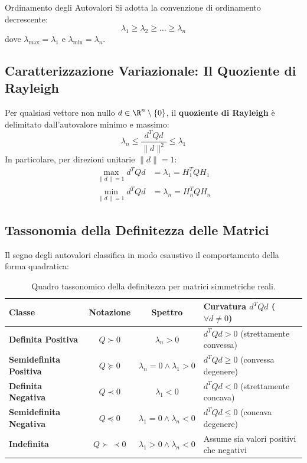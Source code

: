 \begin{noteblock}{Ordinamento degli Autovalori}
Si adotta la convenzione di ordinamento decrescente:
\begin{equation}
\lambda_1 \ge \lambda_2 \ge \dots \ge \lambda_n
\end{equation}
dove $\lambda_{\max} = \lambda_1$ e $\lambda_{\min} = \lambda_n$.
\end{noteblock}

\subsection{Caratterizzazione Variazionale: Il Quoziente di Rayleigh}
Per qualsiasi vettore non nullo $d \in \R^n \setminus \{0\}$, il \textbf{quoziente di Rayleigh} \`e delimitato dall'autovalore minimo e massimo:
\begin{equation}
\lambda_n \le \frac{d^T Q d}{\|d\|^2} \le \lambda_1
\end{equation}
In particolare, per direzioni unitarie $\|d\| = 1$:
\begin{align}
\max_{\|d\|=1} d^T Q d &= \lambda_1 = H_1^T Q H_1 \\
\min_{\|d\|=1} d^T Q d &= \lambda_n = H_n^T Q H_n
\end{align}

\subsection{Tassonomia della Definitezza delle Matrici}
Il segno degli autovalori classifica in modo esaustivo il comportamento della forma quadratica:

\begin{table}[H]
\centering
\small
\renewcommand{\arraystretch}{1.3}
\begin{tabularx}{\textwidth}{l c c X}
\toprule
\textbf{Classe} & \textbf{Notazione} & \textbf{Spettro} & \textbf{Curvatura $d^T Q d$ ($\forall d \neq 0$)} \\
\midrule
\textbf{Definita Positiva} & $Q \succ 0$ & $\lambda_n > 0$ & $d^T Q d > 0$ (strettamente convessa) \\
\textbf{Semidefinita Positiva} & $Q \succeq 0$ & $\lambda_n = 0 \land \lambda_1 > 0$ & $d^T Q d \ge 0$ (convessa degenere) \\
\textbf{Definita Negativa} & $Q \prec 0$ & $\lambda_1 < 0$ & $d^T Q d < 0$ (strettamente concava) \\
\textbf{Semidefinita Negativa} & $Q \preceq 0$ & $\lambda_1 = 0 \land \lambda_n < 0$ & $d^T Q d \le 0$ (concava degenere) \\
\textbf{Indefinita} & $Q \succ\prec 0$ & $\lambda_1 > 0 \land \lambda_n < 0$ & Assume sia valori positivi che negativi \\
\bottomrule
\end{tabularx}
\caption{Quadro tassonomico della definitezza per matrici simmetriche reali.}
\label{tab:definitezza-matrici}
\end{table}


